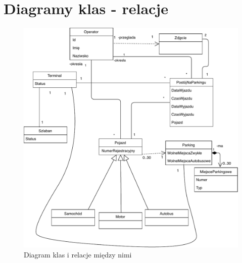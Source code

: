 
\section{Diagramy klas  - relacje}
\label{sec:diagKlas}
\begin{figure}[H]
	\centering
	\includegraphics[width=150mm]{diagramy/DiagKlas.pdf}
	\caption{Diagram klas i relacje między nimi}
\end{figure}



